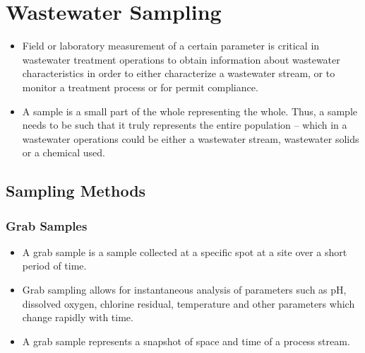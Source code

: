 \section{Wastewater Sampling}
		\begin{itemize}
			\item Field or laboratory measurement of a certain parameter is critical in wastewater treatment operations to obtain information about wastewater characteristics in order to either characterize a wastewater stream, or to monitor a treatment process or for permit compliance.  
			\item A sample is a small part of the whole representing the whole.  Thus, a sample needs to be such that it truly represents the entire population – which in a wastewater operations could be either a wastewater stream, wastewater solids or a chemical used.
		\end{itemize}
		
\subsection{Sampling Methods}
\subsubsection{Grab Samples}
				\begin{itemize}
					\item A grab sample is a sample collected at a specific spot at a site over a short period of time.  
					\item Grab sampling allows for instantaneous analysis of parameters such as pH, dissolved oxygen, chlorine residual, temperature and other parameters which change rapidly with time.
					\item A grab sample represents a snapshot of space and time of a process stream.
					\end{itemize}
